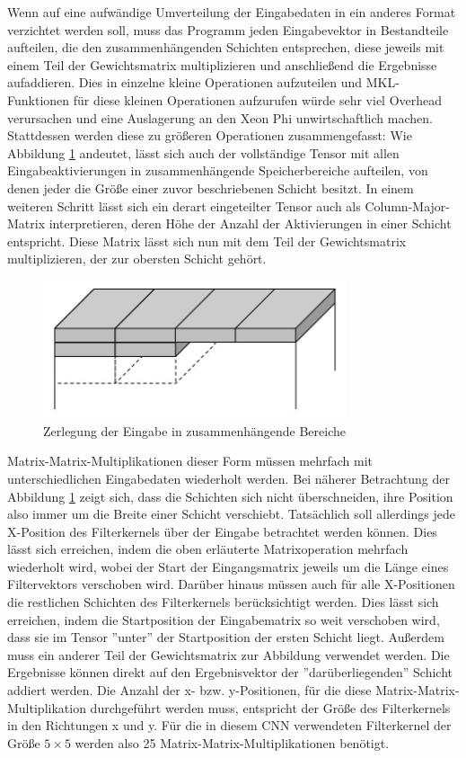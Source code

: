 \documentclass[../main.tex]{subfiles}
\begin{document}
Wenn auf eine aufwändige Umverteilung der Eingabedaten in ein anderes Format verzichtet werden soll, muss das Programm jeden Eingabevektor in Bestandteile aufteilen, die den zusammenhängenden Schichten entsprechen, diese jeweils mit einem Teil der Gewichtsmatrix multiplizieren und anschließend die Ergebnisse aufaddieren. Dies in einzelne kleine Operationen aufzuteilen und MKL-Funktionen für diese kleinen Operationen aufzurufen würde sehr viel Overhead verursachen und eine Auslagerung an den Xeon Phi unwirtschaftlich machen. Stattdessen werden diese zu größeren Operationen zusammengefasst: Wie Abbildung \ref{pic:conv_tensor_tiled} andeutet, lässt sich auch der vollständige Tensor mit allen Eingabeaktivierungen in zusammenhängende Speicherbereiche aufteilen, von denen jeder die Größe einer zuvor beschriebenen Schicht besitzt. In einem weiteren Schritt lässt sich ein derart eingeteilter Tensor auch als Column-Major-Matrix interpretieren, deren Höhe der Anzahl der Aktivierungen in einer Schicht entspricht. Diese Matrix lässt sich nun mit dem Teil der Gewichtsmatrix multiplizieren, der zur obersten Schicht gehört. 
\begin{figure}
	\centering 
	\includegraphics[width=0.8\textwidth]{../images/Schmidt/convTensor2.jpg} 
	\caption {Zerlegung der Eingabe in zusammenhängende Bereiche}
	\label{pic:conv_tensor_tiled} 
\end{figure} 
Matrix-Matrix-Multiplikationen dieser Form müssen mehrfach mit unterschiedlichen Eingabedaten wiederholt werden. Bei näherer Betrachtung der Abbildung \ref{pic:conv_tensor_tiled} zeigt sich, dass die Schichten sich nicht überschneiden, ihre Position also immer um die Breite einer Schicht verschiebt. Tatsächlich soll allerdings jede X-Position des Filterkernels über der Eingabe betrachtet werden können. Dies lässt sich erreichen, indem die oben erläuterte Matrixoperation mehrfach wiederholt wird, wobei der Start der Eingangsmatrix jeweils um die Länge eines Filtervektors verschoben wird. Darüber hinaus müssen auch für alle X-Positionen die restlichen Schichten des Filterkernels berücksichtigt werden. Dies lässt sich erreichen, indem die Startposition der Eingabematrix so weit verschoben wird, dass sie im Tensor ''unter'' der Startposition der ersten Schicht liegt. Außerdem muss ein anderer Teil der Gewichtsmatrix zur Abbildung verwendet werden. Die Ergebnisse können direkt auf den Ergebnisvektor der ''darüberliegenden'' Schicht addiert werden. Die Anzahl der x- bzw. y-Positionen, für die diese Matrix-Matrix-Multiplikation durchgeführt werden muss, entspricht der Größe des Filterkernels in den Richtungen x und y. Für die in diesem CNN verwendeten Filterkernel der Größe \(5\times5\) werden also 25 Matrix-Matrix-Multiplikationen benötigt. 
\end{document}
